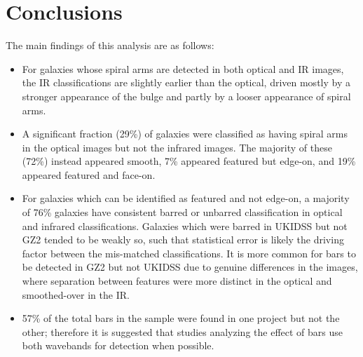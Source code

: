 \section{Conclusions}

The main findings of this analysis are as follows:

\begin{itemize}

\item For galaxies whose spiral arms are detected in both optical and IR images, the IR classifications are slightly earlier than the optical, driven mostly by a stronger appearance of the bulge and partly by a looser appearance of spiral arms. 

\item A significant fraction (29\%) of galaxies were classified as having spiral arms in the optical images but not the infrared images. The majority of these (72\%) instead appeared smooth, 7\% appeared featured but edge-on, and 19\% appeared featured and face-on.

\item For galaxies which can be identified as featured and not edge-on, a majority of 76\% galaxies have consistent barred or unbarred classification in optical and infrared classifications. Galaxies which were barred in UKIDSS but not GZ2 tended to be weakly so, such that statistical error is likely the driving factor between the mis-matched classifications. It is more common for bars to be detected in GZ2 but not UKIDSS due to genuine differences in the images, where separation between features were more distinct in the optical and smoothed-over in the IR.

\item 57\% of the total bars in the sample were found in one project but not the other; therefore it is suggested that studies analyzing the effect of bars use both wavebands for detection when possible.  


\end{itemize}
